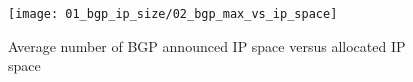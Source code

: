 \begin{figure}[htbp]
	\centering
		\texttt{[image: 01\_bgp\_ip\_size/02\_bgp\_max\_vs\_ip\_space]}
	\caption{Average number of BGP announced IP space versus allocated IP space}
	\label{fig:BGP vs RIR space}
\end{figure}
% 
